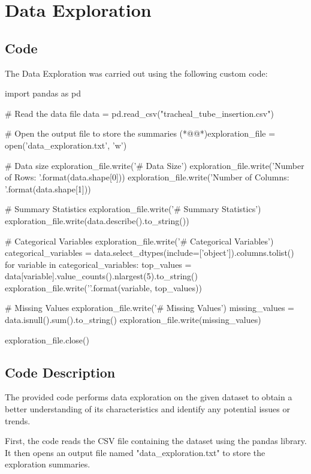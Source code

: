 \documentclass[11pt]{article}
\begin{document}
\section{Data Exploration}
\subsection{{Code}}
The Data Exploration was carried out using the following custom code:

\begin{python}

import pandas as pd

# Read the data file
data = pd.read_csv("tracheal_tube_insertion.csv")

# Open the output file to store the summaries
(*@@*)exploration_file = open('data_exploration.txt', 'w')

# Data size
exploration_file.write('# Data Size\n')
exploration_file.write('Number of Rows: {}\n'.format(data.shape[0]))
exploration_file.write('Number of Columns: {}\n'.format(data.shape[1]))

# Summary Statistics
exploration_file.write('\n# Summary Statistics\n')
exploration_file.write(data.describe().to_string())

# Categorical Variables
exploration_file.write('\n# Categorical Variables\n')
categorical_variables = data.select_dtypes(include=['object']).columns.tolist()
for variable in categorical_variables:
    top_values = data[variable].value_counts().nlargest(5).to_string()
    exploration_file.write('\n{}\n{}\n'.format(variable, top_values))

# Missing Values
exploration_file.write('\n# Missing Values\n')
missing_values = data.isnull().sum().to_string()
exploration_file.write(missing_values)

exploration_file.close()

\end{python}

\subsection{Code Description}

The provided code performs data exploration on the given dataset to obtain a better understanding of its characteristics and identify any potential issues or trends.

First, the code reads the CSV file containing the dataset using the pandas library. It then opens an output file named "data\_exploration.txt" to store the exploration summaries.
\end{document}
